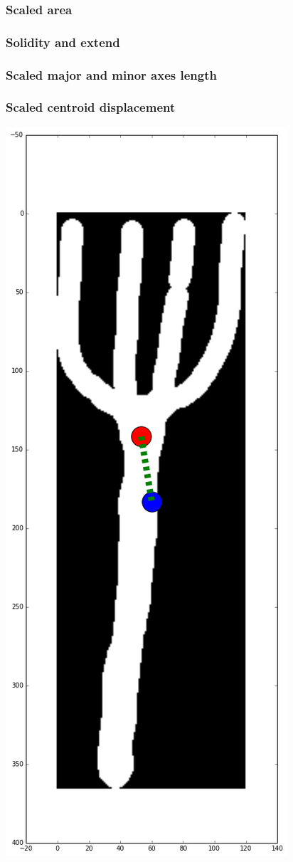 \documentclass[12pt]{article}
\begin{document}
\subsubsection{Scaled area}
\subsubsection{Solidity and extend}
\subsubsection{Scaled major and minor axes length}
\subsubsection{Scaled centroid displacement}

\includegraphics[scale=0.26]{fork_centroid.png}
\end{document}
